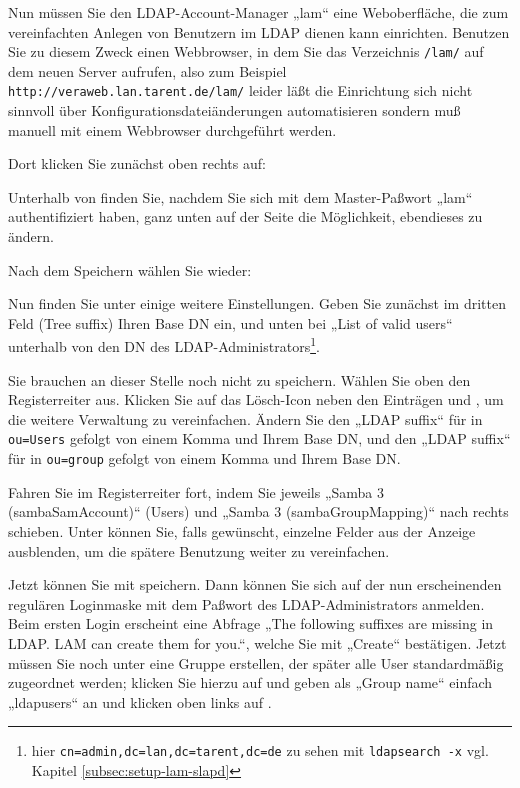Nun müssen Sie den LDAP-Account-Manager „lam“ \dash eine Weboberfläche,
die zum vereinfachten Anlegen von Benutzern im LDAP dienen kann \dash
einrichten. Benutzen Sie zu diesem Zweck einen Webbrowser, in dem Sie
das Verzeichnis \texttt{/lam/} auf dem neuen Server aufrufen, also zum
Beispiel \texttt{http://veraweb.lan.tarent.de/lam/} \dash leider läßt
die Einrichtung sich nicht sinnvoll über Konfigurationsdateiänderungen
automatisieren sondern muß manuell mit einem Webbrowser durchgeführt
werden.

Dort klicken Sie zunächst oben rechts auf:

Unterhalb von  finden
Sie, nachdem Sie sich mit dem Master-Paßwort „lam“ authentifiziert
haben, ganz unten auf der Seite die Möglichkeit, ebendieses zu ändern.

Nach dem Speichern wählen Sie wieder:

Nun finden Sie unter 
einige weitere Einstellungen. Geben Sie zunächst im dritten Feld
(Tree suffix) Ihren Base DN ein, und unten bei „List of valid users“
unterhalb von  den DN
des LDAP-Administrators\Hair\footnote{hier
\texttt{cn=admin,dc=lan,dc=tarent,dc=de} \dash zu sehen mit
\texttt{ldapsearch -x} \dash vgl. Kapitel \ref{subsec:setup-lam-slapd}}.

Sie brauchen an dieser Stelle noch nicht zu speichern. Wählen Sie oben
den Registerreiter  aus. Klicken
Sie auf das Lösch-Icon  neben den Einträgen
 und , um die weitere Verwaltung zu vereinfachen. Ändern Sie
den „LDAP suffix“ für  in \texttt{ou=Users}
gefolgt von einem Komma und Ihrem Base DN, und den „LDAP suffix“ für
 in \texttt{ou=group} gefolgt von einem
Komma und Ihrem Base DN.

Fahren Sie im Registerreiter  fort,
indem Sie jeweils „Samba 3 (sambaSamAccount)“ (Users) und „Samba 3
(sambaGroupMapping)“ nach  rechts schieben.
Unter  können Sie, falls
gewünscht, einzelne Felder aus der Anzeige ausblenden, um die spätere
Benutzung weiter zu vereinfachen.

Jetzt können Sie mit  speichern. Dann können
Sie sich auf der nun erscheinenden regulären Loginmaske mit dem Paßwort
des LDAP-Administrators anmelden. Beim ersten Login erscheint eine
Abfrage „The following suffixes are missing in LDAP. LAM can create them
for you.“, welche Sie mit „Create“ bestätigen. Jetzt müssen Sie noch
unter  eine Gruppe erstellen, der später
alle User standardmäßig zugeordnet werden; klicken Sie hierzu auf
 und geben als „Group name“ einfach
„ldapusers“ an und klicken oben links auf .

